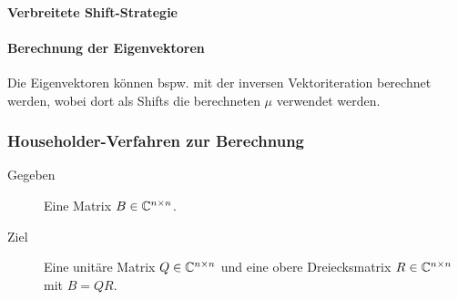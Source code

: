 				\paragraph{Verbreitete Shift-Strategie}

				\paragraph{Berechnung der Eigenvektoren}
					Die Eigenvektoren können bspw. mit der inversen Vektoriteration berechnet werden, wobei dort als Shifts die berechneten \(\mu\) verwendet werden.

			\subsubsection{Householder-Verfahren zur Berechnung}
				\label{sec:householder}

				\begin{description}
					\item[Gegeben] Eine Matrix \( B \in \mathbb{C}^{n \times n} \).
					\item[Ziel] Eine unitäre Matrix \( Q \in \mathbb{C}^{n \times n} \) und eine obere Dreiecksmatrix \( R \in \mathbb{C}^{n \times n} \) mit \( B = QR \).
				\end{description}

